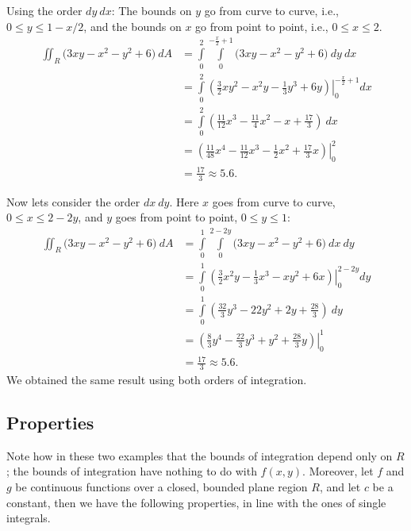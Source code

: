 \begin{example}
Using the order $dy\ dx$:
The bounds on $y$ go from curve to curve, i.e., $0\leq y\leq 1-x/2$, and the bounds on $x$ go from point to point, i.e., $0\leq x\leq 2$.
\allowdisplaybreaks
\begin{align*}
\iint_R (3xy-x^2-y^2+6\big)\ dA &= \int\limits_0^2\int\limits_0^{-\frac x2+1} (3xy-x^2-y^2+6\big)\ dy\ dx\\
		&= \int\limits_0^2 \left.\left(\frac32xy^2-x^2y-\frac13y^3+6y\right)\right|_0^{-\frac x2+1} dx\\
		&= \int\limits_0^2 \left(\frac{11}{12}x^3-\frac{11}{4}x^2-x+\frac{17}3\right)\ dx \\
		&= \left.\left(\frac{11}{48}x^4-\frac{11}{12}x^3-\frac12x^2+\frac{17}3x\right)\right|_0^2\\
		&= \frac{17}3\approx5.6.
\end{align*}

Now lets consider the order $dx \ dy$. Here $x$ goes from curve to curve, $0\leq x\leq 2-2y$, and $y$ goes from point to point, $0\leq y\leq 1$:
\begin{align*}
\iint_R (3xy-x^2-y^2+6\big)\ dA &= \int\limits_0^1\int\limits_0^{2-2y} (3xy-x^2-y^2+6\big)\ dx\ dy\\
		&= \int\limits_0^1 \left.\left(\frac32x^2y-\frac13x^3-xy^2+6x\right) \right|_0^{2-2y} dy\\
		&= \int\limits_0^1\left(\frac{32}3y^3-22y^2+2y+\frac{28}3\right)\ dy\\
		&=\left.\left(\frac83y^4-\frac{22}3y^3+y^2+\frac{28}3y\right)\right|_0^1\\
		&=\frac{17}3\approx5.6.
\end{align*}
We obtained the same result using both orders of integration. 
\end{example}

\subsection{Properties}

Note how in these two examples that the bounds of integration depend only on $R$; the bounds of integration have nothing to do with $f(x,y)$. Moreover, let $f$ and $g$ be continuous functions over a closed, bounded plane region $R$, and let $c$ be a constant, then we have the following properties, in line with the ones of single integrals. 

